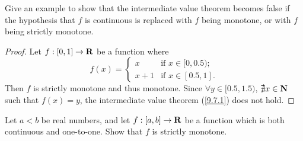\begin{exercise}\label{ex 9.8.2}
  Give an example to show that the intermediate value theorem becomes false if the hypothesis that \(f\) is continuous is replaced with \(f\) being monotone, or with \(f\) being strictly monotone.
\end{exercise}

\begin{proof}
  Let \(f : [0, 1] \to \mathbf{R}\) be a function where
  \[
    f(x) = \begin{cases}
      x     & \text{if } x \in [0, 0.5); \\
      x + 1 & \text{if } x \in [0.5, 1].
    \end{cases}
  \]
  Then \(f\) is strictly monotone and thus monotone.
  Since \(\forall y \in [0.5, 1.5)\), \(\nexists x \in \mathbf{N}\) such that \(f(x) = y\), the intermediate value theorem (\cref{9.7.1}) does not hold.
\end{proof}

\begin{exercise}\label{ex 9.8.3}
  Let \(a < b\) be real numbers, and let \(f : [a, b] \to \mathbf{R}\) be a function which is both continuous and one-to-one.
  Show that \(f\) is strictly monotone.
\end{exercise}

